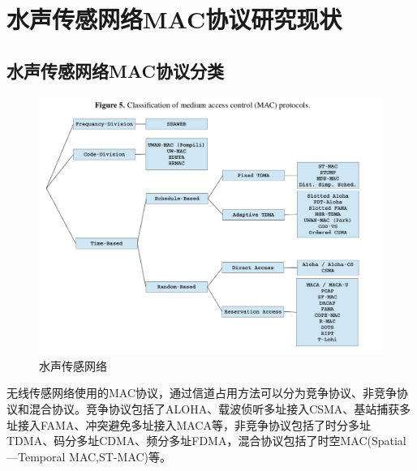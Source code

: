 \chapter{水声传感网络MAC协议研究现状 }
\section{水声传感网络MAC协议分类}
\begin{figure}[ht]
	\centering
	\includegraphics[scale=0.2]{figures/cha.png}
	\caption{
		水声传感网络
	}
	\label{fig:example}
\end{figure}
无线传感网络使用的MAC协议，通过信道占用方法可以分为竞争协议、非竞争协议和混合协议。竞争协议包括了ALOHA、载波侦听多址接入CSMA、基站捕获多址接入FAMA、冲突避免多址接入MACA等，非竞争协议包括了时分多址TDMA、码分多址CDMA、频分多址FDMA，混合协议包括了时空MAC(Spatial—Temporal MAC,ST-MAC)等。
